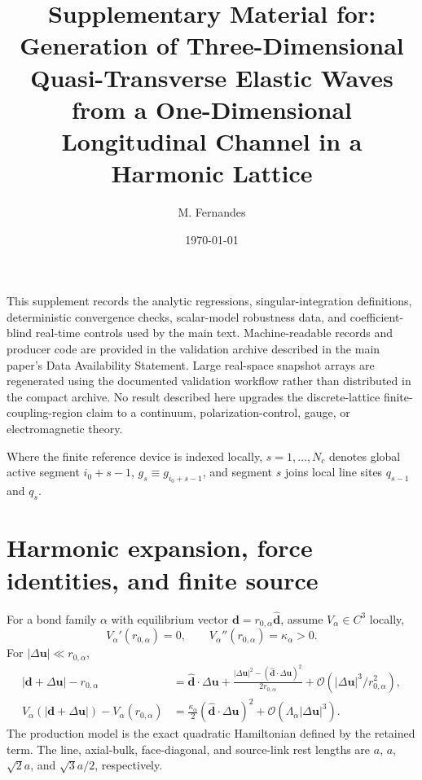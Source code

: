 \documentclass[10pt,aps,pre,onecolumn,notitlepage,nofootinbib]{revtex4-2}
\newcommand{\vu}{\bm u}
\newcommand{\order}{\mathcal O}
\begin{document}
\title{Supplementary Material for: Generation of Three-Dimensional Quasi-Transverse Elastic Waves from a One-Dimensional Longitudinal Channel in a Harmonic Lattice}
\author{M. Fernandes}
\date{\today}
\maketitle

This supplement records the analytic regressions, singular-integration definitions, deterministic convergence checks, scalar-model robustness data, and coefficient-blind real-time controls used by the main text. Machine-readable records and producer code are provided in the validation archive described in the main paper's Data Availability Statement. Large real-space snapshot arrays are regenerated using the documented validation workflow rather than distributed in the compact archive. No result described here upgrades the discrete-lattice finite-coupling-region claim to a continuum, polarization-control, gauge, or electromagnetic theory.

Where the finite reference device is indexed locally, $s=1,\ldots,N_c$ denotes global active segment $i_0+s-1$, $g_s\equiv g_{i_0+s-1}$, and segment $s$ joins local line sites $q_{s-1}$ and $q_s$.

\section{Harmonic expansion, force identities, and finite source}

For a bond family $\alpha$ with equilibrium vector $\bm d=r_{0,\alpha}\hat{\bm d}$, assume $V_\alpha\in C^3$ locally,
\begin{equation}
 V_\alpha'(r_{0,\alpha})=0,
 \qquad V_\alpha''(r_{0,\alpha})=\kappa_\alpha>0.
\end{equation}
For $|\Delta\vu|\ll r_{0,\alpha}$,
\begin{align}
 |\bm d+\Delta\vu|-r_{0,\alpha}
 &=\hat{\bm d}\cdot\Delta\vu
 +\frac{|\Delta\vu|^2-(\hat{\bm d}\cdot\Delta\vu)^2}{2r_{0,\alpha}}
 +\order(|\Delta\vu|^3/r_{0,\alpha}^2),\\
 V_\alpha(|\bm d+\Delta\vu|)-V_\alpha(r_{0,\alpha})
 &=\frac{\kappa_\alpha}{2}(\hat{\bm d}\cdot\Delta\vu)^2
 +\order(\Lambda_\alpha|\Delta\vu|^3).
\end{align}
The production model is the exact quadratic Hamiltonian defined by the retained term.  The line, axial-bulk, face-diagonal, and source-link rest lengths are $a$, $a$, $\sqrt2a$, and $\sqrt3a/2$, respectively.
\end{document}
